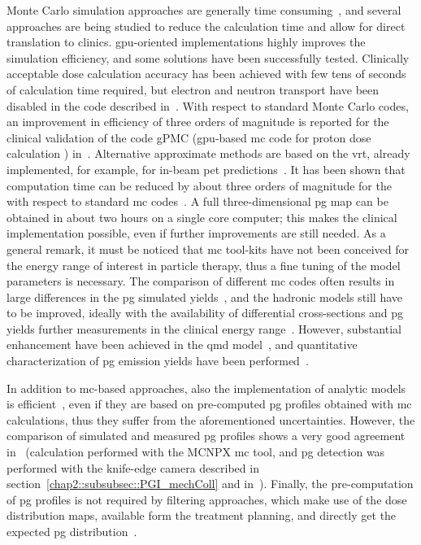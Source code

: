 Monte Carlo simulation approaches are generally time consuming~\parencite{Robert2013, Dedes2015, Schumann2015}, and several approaches are being studied to reduce the calculation time and allow for direct translation to clinics. \gls{gpu}-oriented implementations highly improves the simulation efficiency, and some solutions have been successfully tested. Clinically acceptable dose calculation accuracy has been achieved with few tens of seconds of calculation time required, but electron and neutron transport have been disabled in the code described in~\cite{Qin2017}. With respect to standard Monte Carlo codes, an improvement in efficiency of three orders of magnitude is reported for the clinical validation of the code gPMC (\gls{gpu}-based \gls{mc} code for proton dose calculation ) in~\cite{Giantsoudi2015}. 
Alternative approximate methods are based on the \gls{vrt}, already implemented, for example, for in-beam \gls{pet} predictions~\parencite{Sommerer2009}. It has been shown that computation time can be reduced by about three orders of magnitude for the with respect to standard \gls{mc} codes~\parencite{Huisman2016, ElKanawati2015}. A full three-dimensional \gls{pg} map can be obtained in about two hours on a single core computer; this makes the clinical implementation possible, even if further improvements are still needed.  
As a general remark, it must be noticed that \gls{mc} tool-kits have not been conceived for the energy range of interest in particle therapy, thus a fine tuning of the model parameters is necessary. The comparison of different \gls{mc} codes often results in large differences in the \gls{pg} simulated yields~\parencite{Bohlen2010, Verburg2012, Schumann2015}, and the hadronic models still have to be improved, ideally with the availability of differential cross-sections and \gls{pg} yields further measurements in the clinical energy range~\parencite{Newhauser2015}. However, substantial enhancement have been achieved in the \gls{qmd} model~\parencite{Dedes2014}, and quantitative characterization of \gls{pg} emission yields have been performed~\parencite{Schumann2015, Pinto2016}.

In addition to \gls{mc}-based approaches, also the implementation of analytic models is efficient~\parencite{Sterpin2015, Russo2016}, even if they are based on pre-computed \gls{pg} profiles obtained with \gls{mc} calculations, thus they suffer from the aforementioned uncertainties. However, the comparison of simulated and measured \gls{pg} profiles shows a very good agreement in~\parencite{Sterpin2015} (calculation performed with the MCNPX \gls{mc} tool, and \gls{pg} detection was performed with the knife-edge camera described in section~\ref{chap2::subsubsec::PGI_mechColl} and in~\cite{Perali2014}).
Finally, the pre-computation of \gls{pg} profiles is not required by filtering approaches, which make use of the dose distribution maps, available form the treatment planning, and directly get the expected \gls{pg} distribution~\parencite{Kroniger2015}.  
  
